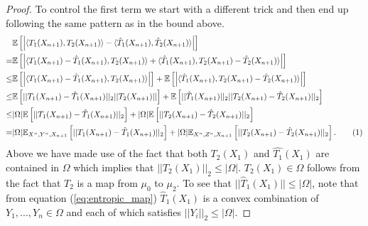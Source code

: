 \documentclass[nohyperref]{article}
\theoremstyle{definition}
\begin{document}
\begin{proof}
    
    To control the first term we start with a different trick and then end up following the same pattern as in the bound above.
    \begin{align*}
        &\mathbb{E}\left [ \left | \langle T_1(X_{n+1}), T_2(X_{n+1})\rangle - \langle \hat{T}_1(X_{n+1}), \hat{T}_2(X_{n+1})\rangle \right | \right ] \\
        =& \mathbb{E}\left [ \left | \langle T_1(X_{n+1}) - \hat{T}_1(X_{n+1}), T_2(X_{n+1})\rangle + \langle \hat{T}_1(X_{n+1}), T_2(X_{n+1}) - \hat{T}_2(X_{n+1})\rangle \right | \right ] \\
        \leq& \mathbb{E}\left[ \left | \langle T_1(X_{n+1}) - \hat{T}_1(X_{n+1}), T_2(X_{n+1})\rangle \right | \right] + \mathbb{E}\left[ \left | \langle \hat{T}_1(X_{n+1}), T_2(X_{n+1}) - \hat{T}_2(X_{n+1})\rangle \right | \right] \\
        \leq&  \mathbb{E}\left[ ||T_1(X_{n+1}) - \hat{T}_1(X_{n+1})||_2 ||T_2(X_{n+1})|| \right] + \mathbb{E}\left[ || \hat{T}_1(X_{n+1}) ||_2 ||T_2(X_{n+1}) - \hat{T}_2(X_{n+1})||_2 \right] \\
        \leq& |\Omega| \mathbb{E}\left[ ||T_1(X_{n+1}) - \hat{T}_1(X_{n+1})||_2 \right] + |\Omega|\mathbb{E}\left[ ||T_2(X_{n+1}) - \hat{T}_2(X_{n+1})||_2 \right] \\
        =& |\Omega| \mathbb{E}_{X^n,Y^n,X_{n+1}}\left[ ||T_1(X_{n+1}) - \hat{T}_1(X_{n+1})||_2 \right] + |\Omega|\mathbb{E}_{X^n,Z^n,X_{n+1}}\left[ ||T_2(X_{n+1}) - \hat{T}_2(X_{n+1})||_2 \right]. \stepcounter{equation}\tag{\theequation}\label{eq:two_terms}
    \end{align*}
    Above we have made use of the fact that both $T_2(X_1)$ and $\hat{T_1}(X_1)$ are contained in $\Omega$ which implies that $||T_2(X_1)||_2 \leq |\Omega|$.  $T_2(X_1) \in \Omega$ follows from the fact that $T_2$ is a map from $\mu_0$ to $\mu_2$. To see that $||\hat{T}_1(X_1)|| \leq |\Omega|$, note that from equation (\ref{eq:entropic_map}) $\hat{T}_1(X_1)$ is a convex combination of $Y_1,...,Y_n \in \Omega$ and each of which satisfies $||Y_i||_2 \leq |\Omega|$. 
    

\end{proof}
\end{document}
